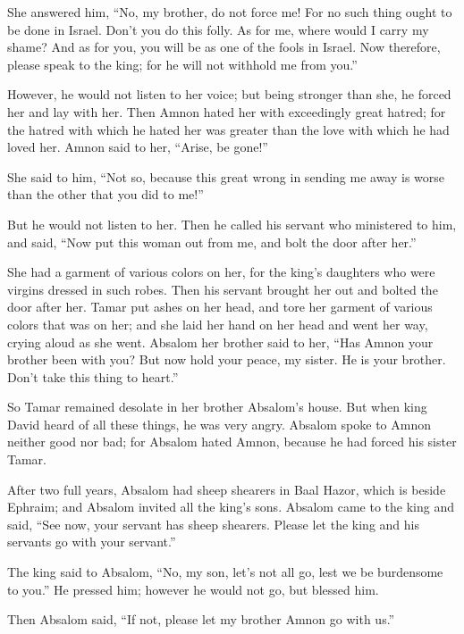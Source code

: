 She answered him, ``No, my brother, do not force me! For
no such thing ought to be done in Israel. Don't you do this folly.
 As for me, where would I carry my shame? And as for you,
you will be as one of the fools in Israel. Now therefore, please speak
to the king; for he will not withhold me from you.''

 However, he would not listen to her voice; but being
stronger than she, he forced her and lay with her.  Then
Amnon hated her with exceedingly great hatred; for the hatred with which
he hated her was greater than the love with which he had loved her.
Amnon said to her, ``Arise, be gone!''

 She said to him, ``Not so, because this great wrong in
sending me away is worse than the other that you did to me!''

But he would not listen to her.  Then he called his servant
who ministered to him, and said, ``Now put this woman out from me, and
bolt the door after her.''

 She had a garment of various colors on her, for the king's
daughters who were virgins dressed in such robes. Then his servant
brought her out and bolted the door after her.  Tamar put
ashes on her head, and tore her garment of various colors that was on
her; and she laid her hand on her head and went her way, crying aloud as
she went.  Absalom her brother said to her, ``Has Amnon
your brother been with you? But now hold your peace, my sister. He is
your brother. Don't take this thing to heart.''

So Tamar remained desolate in her brother Absalom's house. 
But when king David heard of all these things, he was very angry.
 Absalom spoke to Amnon neither good nor bad; for Absalom
hated Amnon, because he had forced his sister Tamar.

 After two full years, Absalom had sheep shearers in Baal
Hazor, which is beside Ephraim; and Absalom invited all the king's sons.
 Absalom came to the king and said, ``See now, your servant
has sheep shearers. Please let the king and his servants go with your
servant.''

 The king said to Absalom, ``No, my son, let's not all go,
lest we be burdensome to you.'' He pressed him; however he would not go,
but blessed him.

 Then Absalom said, ``If not, please let my brother Amnon
go with us.''

